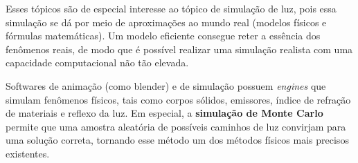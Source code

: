Esses tópicos são de especial interesse ao tópico de simulação de luz, pois essa simulação se dá por meio de aproximações ao mundo real (modelos físicos e fórmulas matemáticas). Um modelo eficiente consegue reter a essência dos fenômenos reais, de modo que é possível realizar uma simulação realista com uma capacidade computacional não tão elevada.

Softwares de animação (como blender) e de simulação possuem \textit{engines} que simulam fenômenos físicos, tais como corpos sólidos, emissores, índice de refração de materiais e reflexo da luz. Em especial, a \textbf{simulação de Monte Carlo} permite que uma amostra aleatória de possíveis caminhos de luz convirjam para uma solução correta, tornando esse método um dos métodos físicos mais precisos existentes.

